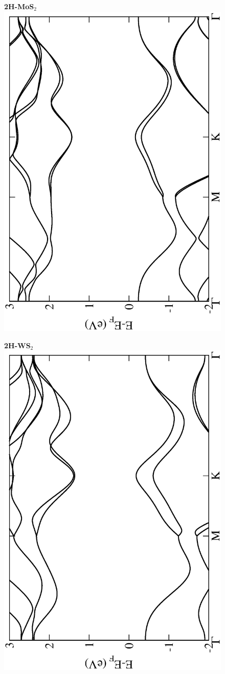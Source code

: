 \begin{figure}[htbp]
\centering
{\bfseries \sffamily 2H-MoS$_{2}$}\\
\includegraphics[width=0.45\linewidth, angle=-90, trim={2.9cm, 0cm, 2cm, 0cm}, clip]{img/SI_figs/BS/2H-MoS2.eps}
\end{figure}

\begin{figure}[htbp]
\centering
{\bfseries \sffamily 2H-WS$_{2}$}\\
\includegraphics[width=0.45\linewidth, angle=-90, trim={2.9cm, 0cm, 2cm, 0cm}, clip]{img/SI_figs/BS/2H-WS2.eps}
\end{figure}

